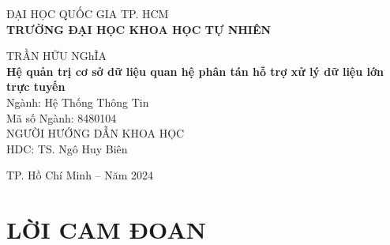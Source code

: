 \documentclass{article}[14pt]
\begin{document}
\begin{mdframed}[linewidth=1pt, linecolor=black, innerleftmargin=10mm, innerrightmargin=10mm, innertopmargin=10mm, innerbottommargin=10mm]
        \centering
        \vspace*{1cm}
        
        \Large ĐẠI HỌC QUỐC GIA TP. HCM\\
    \vspace{0.25cm}
    \Large \textbf{TRƯỜNG ĐẠI HỌC KHOA HỌC TỰ NHIÊN}\\
        
        \vspace{2cm}
        
        TRẦN HỮU NGhĨA\\[3cm]
        
        \textbf{Hệ quản trị cơ sở dữ liệu quan hệ phân tán
hỗ trợ xử lý dữ liệu lớn trực tuyến}\\[2cm]
        
        Ngành: Hệ Thống Thông Tin\\
        Mã số Ngành: 8480104\\[2cm]
        
        NGƯỜI HƯỚNG DẪN KHOA HỌC\\
        HDC: TS. Ngô Huy Biên

           TP. Hồ Chí Minh – Năm 2024
    \end{mdframed}
    \vfill
    
 

\pagebreak
{}




    
\section*{\centering LỜI CAM ĐOAN}
\end{document}
